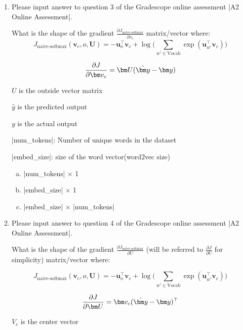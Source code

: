 \begin{enumerate}[1.]
\item {}
Please input answer to question 3 of the Gradescope online assessment |A2 Online Assessment|.

What is the shape of the gradient $\frac{\partial J_\text{naive-softmax}}{\partial v_c}$ matrix/vector where:
\begin{equation*} J_{\text{naive-softmax}}(\bm v_c, o, \bm U) = - \bm u_{o}^\top \bm v_c + \log \bigg( \sum_{w' \in \text{Vocab}} \exp(\bm u_{w'}^\top \bm v_c) \bigg) \end{equation*}

\begin{equation*} {\partial J \over \partial \bm v_c} = \bm U(\hat{\bm y} - \bm y)\end{equation*}

$U$ is the outside vector matrix

$\hat{y}$ is the predicted output

$y$ is the actual output

|num_tokens|: Number of unique words in the dataset

|embed_size|: size of the word vector(word2vec size)

\begin{enumerate}[(a)]
\item |num_tokens| $\times$ 1
\item |embed_size| $\times$ 1
\item |embed_size| $\times$ |num_tokens|
\end{enumerate}

\item {}
Please input answer to question 4 of the Gradescope online assessment |A2 Online Assessment|.

What is the shape of the gradient $\frac{\partial J_\text{naive-softmax}}{\partial U}$ (will be referred to $\frac{\partial J}{\partial U}$ for simplicity) matrix/vector where:

\begin{equation*} J_{\text{naive-softmax}}(\bm v_c, o, \bm U) = - \bm u_{o}^\top \bm v_c + \log \bigg( \sum_{w' \in \text{Vocab}} \exp(\bm u_{w'}^\top \bm v_c) \bigg) \end{equation*}

\begin{equation*} {\partial J \over \partial \bm U } = {\bm v_c} (\hat{\bm y} - \bm y)^\top \end{equation*}

$V_c$ is the center vector


\end{enumerate}
